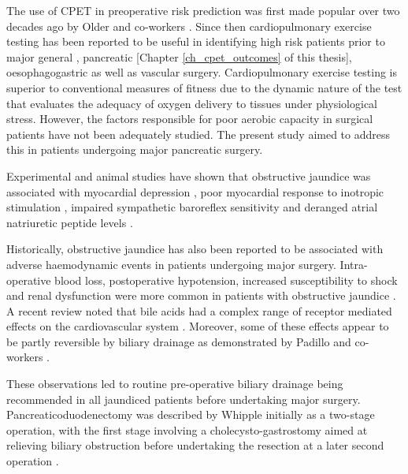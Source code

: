 The use of CPET in preoperative risk prediction was first made popular over two decades ago by Older and co-workers \parencite{older_preoperative_1993}. 
Since then cardiopulmonary exercise testing has been reported to be useful in identifying high risk patients prior to major general \parencite{snowden_submaximal_2010}, pancreatic \parencite{ausania_effects_2012}[Chapter \ref{ch_cpet_outcomes} of this thesis], oesophagogastric \parencite{nagamatsu_preoperative_2001} as well as vascular \parencite{carlisle_mid-term_2007} surgery. 
Cardiopulmonary exercise testing is superior to conventional measures of fitness due to the dynamic nature of the test that evaluates the adequacy of oxygen delivery to tissues under physiological stress. 
However, the factors responsible for poor aerobic capacity in surgical patients have not been adequately studied. 
The present study aimed to address this in patients undergoing major pancreatic surgery.

Experimental and animal studies have shown that obstructive jaundice was associated with myocardial depression \parencite{green_jaundiced_1986}, poor myocardial response to inotropic stimulation \parencite{lumlertgul_jaundiced_1991}, impaired sympathetic baroreflex sensitivity \parencite{song_baroreflex_2009} and deranged atrial natriuretic peptide levels \parencite{pereira_increased_1994,gallardo_increased_1998}. 

Historically, obstructive jaundice has also been reported to be associated with adverse haemodynamic events in patients undergoing major surgery. 
Intra-operative blood loss, postoperative hypotension, increased susceptibility to shock and renal dysfunction were more common in patients with obstructive jaundice \parencite{dixon_factors_1983, pain_perioperative_1985, green_systemic_1995}.
A recent review noted that bile acids had a complex range of receptor mediated effects on the cardiovascular system \parencite{khurana_bile_2011}. 
Moreover, some of these effects appear to be partly reversible by biliary drainage as demonstrated by Padillo and co-workers \parencite{padillo_improved_2001}.

These observations led to routine pre-operative biliary drainage being recommended in all jaundiced patients before undertaking major surgery. 
Pancreaticoduodenectomy was described by Whipple initially as a two-stage operation, with the first stage involving a cholecysto-gastrostomy aimed at relieving biliary obstruction before undertaking the resection at a later second operation \parencite{whipple_treatment_1935}.

